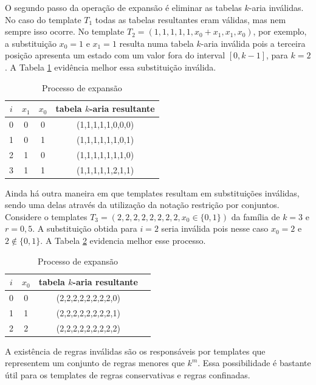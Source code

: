 \documentclass[12pt,a4paper]{article}
\begin{document}
	O segundo passo da operação de expansão é eliminar as tabelas $k$-aria inválidas. No caso do template $T_1$ todas as tabelas resultantes eram válidas, mas nem sempre isso ocorre. No template $T_2 = (1,1,1,1,1,x_0+x_1,x_1,x_0)$, por exemplo, a substituição $x_0 = 1$ e $x_1 = 1$ resulta numa tabela $k$-aria inválida pois a terceira posição apresenta um estado com um valor fora do interval $[0,k-1]$, para $k=2$. A Tabela \ref{tab:invalideExpansion} evidência melhor essa substituição inválida.

	\begin{table}[h!]
	\centering
	\caption{Processo de expansão}
	{
		\vspace{0.3cm}
		\begin{tabular}{cccc}
		\hline
		$i$ & $x_1$ & $x_0$ & tabela $k$-aria resultante \\
		\hline
		0	&	0	&	0	&	(1,1,1,1,1,0,0,0)	\\
		1	&	0	&	1	&	(1,1,1,1,1,1,0,1)	\\
		2	&	1	&	0	&	(1,1,1,1,1,1,1,0)	\\
		3	&	1	&	1	&	(1,1,1,1,1,2,1,1)	\\
		\hline
		\end{tabular}
	}
	\label{tab:invalideExpansion}
	\end{table}

	Ainda há outra maneira em que templates resultam em substituições inválidas, sendo uma delas através da utilização da notação restrição por conjuntos. Considere o templates $T_3 = (2,2,2,2,2,2,2,2,x_0\in \{0,1\})$ da família de $k=3$ e $r=0,5$. A substituição obtida para $i = 2$ seria inválida pois nesse caso $x_0 = 2$ e $2 \notin \{0,1\}$. A Tabela \ref{tab:invalideExpansion2} evidencia melhor esse processo.

	\begin{table}[h!]
	\centering
	\caption{Processo de expansão}
	{
		\vspace{0.3cm}
		\begin{tabular}{cccc}
		\hline
		$i$ & $x_0$ & tabela $k$-aria resultante \\
		\hline
		0	&	0	&	(2,2,2,2,2,2,2,2,0)	\\
		1	&	1	&	(2,2,2,2,2,2,2,2,1)	\\
		2	&	2	&	(2,2,2,2,2,2,2,2,2)	\\
		\hline
		\end{tabular}
	}
	\label{tab:invalideExpansion2}
	\end{table}

	A existência de regras inválidas são os responsáveis por templates que representem um conjunto de regras menores que $k^m$. Essa possibilidade é bastante útil para os templates de regras conservativas e regras confinadas.
\end{document}
